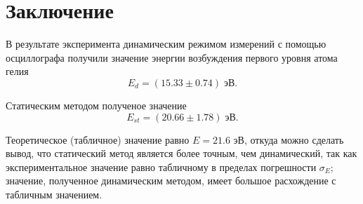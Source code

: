 \section{Заключение}

    В результате эксперимента динамическим режимом измерений с помощью осциллографа получили значение энергии возбуждения первого уровня атома гелия 
    \begin{equation}
        E_d = (15.33 \pm 0.74) \; \text{эВ}.
    \end{equation}

    Статическим методом полученое значение
    \begin{equation}
        E_{st} = (20.66 \pm 1.78) \; \text{эВ}.
    \end{equation}

    Теоретическое (табличное) значение равно $E = 21.6$ эВ, откуда можно сделать вывод, что статический метод является более точным, чем динамический, так как экспериментальное значение равно табличному в пределах погрешности $\sigma_E$; значение, полученное динамическим методом, имеет большое расхождение с табличным значением.